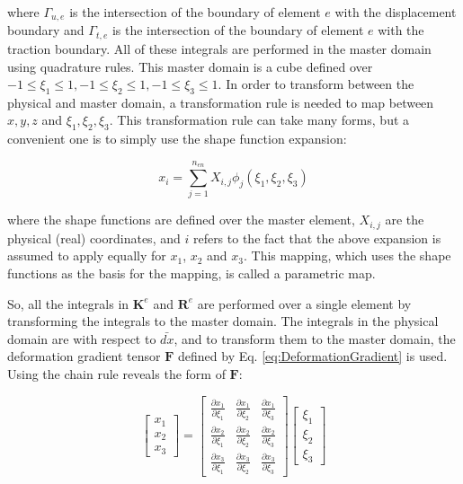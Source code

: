 \documentclass[10pt]{article}
\begin{document}
where \(\Gamma_{u,e}\) is the intersection of the boundary of element \(e\) with the displacement boundary and \(\Gamma_{t,e}\) is the intersection of the boundary of element \(e\) with the traction boundary. All of these integrals are performed in the master domain using quadrature rules. This master domain is a cube defined over \(-1\leq\xi_1\leq1, -1\leq\xi_2\leq1, -1\leq\xi_3\leq1\). In order to transform between the physical and master domain, a transformation rule is needed to map between \(x,y,z\) and \(\xi_1,\xi_2,\xi_3\). This transformation rule can take many forms, but a convenient one is to simply use the shape function expansion:

\begin{equation}
x_i=\sum_{j=1}^{n_{en}}X_{i,j}\phi_j(\xi_1,\xi_2,\xi_3)
\end{equation}

where the shape functions are defined over the master element, \(X_{i,j}\) are the physical (real) coordinates, and \(i\) refers to the fact that the above expansion is assumed to apply equally for \(x_1\), \(x_2\) and \(x_3\). This mapping, which uses the shape functions as the basis for the mapping, is called a parametric map. 

So, all the integrals in \(\textbf{K}^e\) and \(\textbf{R}^e\) are performed over a single element by transforming the integrals to the master domain. The integrals in the physical domain are with respect to \(\bar{dx}\), and to transform them to the master domain, the deformation gradient tensor \(\textbf{F}\) defined by Eq. \eqref{eq:DeformationGradient} is used. Using the chain rule reveals the form of \(\textbf{F}\):

\begin{equation}
\label{eq:FForm}
\begin{bmatrix}x_1\\x_2\\x_3\end{bmatrix}=
\begin{bmatrix}\frac{\partial x_1}{\partial \xi_1}&\frac{\partial x_1}{\partial \xi_2}&\frac{\partial x_1}{\partial \xi_3}\\
\frac{\partial x_2}{\partial \xi_1}&\frac{\partial x_2}{\partial \xi_2}&\frac{\partial x_2}{\partial \xi_3}\\
\frac{\partial x_3}{\partial \xi_1}&\frac{\partial x_3}{\partial \xi_2}&\frac{\partial x_3}{\partial \xi_3}\end{bmatrix}
\begin{bmatrix}\xi_1\\\xi_2\\\xi_3\end{bmatrix}
\end{equation}
\end{document}
